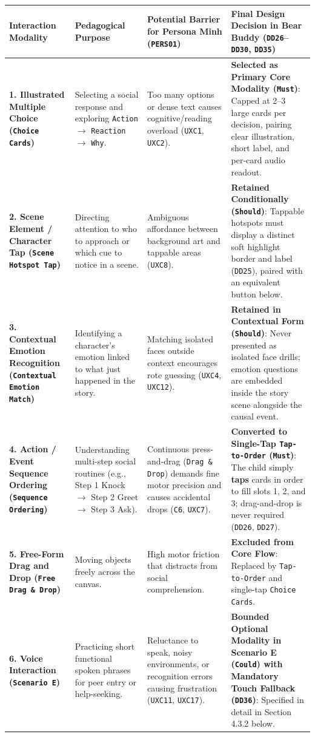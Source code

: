 \noindent\begin{xltabular}{\textwidth}{|p{2.0cm}|p{3.2cm}|X|p{2.8cm}|}
\hline
\textbf{Interaction Modality} & \textbf{Pedagogical Purpose} & \textbf{Potential Barrier for Persona Minh (\texttt{PERS01})} & \textbf{Final Design Decision in Bear Buddy (\texttt{DD26}–\texttt{DD30}, \texttt{DD35})} \\ \hline
\endhead
\textbf{1. Illustrated Multiple Choice (\texttt{Choice Cards})} & Selecting a social response and exploring \texttt{Action} $\rightarrow$ \texttt{Reaction} $\rightarrow$ \texttt{Why}. & Too many options or dense text causes cognitive/reading overload (\texttt{UXC1}, \texttt{UXC2}). & \textbf{Selected as Primary Core Modality (\texttt{Must})}: Capped at 2–3 large cards per decision, pairing clear illustration, short label, and per-card audio readout. \\ \hline
\textbf{2. Scene Element / Character Tap (\texttt{Scene Hotspot Tap})} & Directing attention to who to approach or which cue to notice in a scene. & Ambiguous affordance between background art and tappable areas (\texttt{UXC8}). & \textbf{Retained Conditionally (\texttt{Should})}: Tappable hotspots must display a distinct soft highlight border and label (\texttt{DD25}), paired with an equivalent button below. \\ \hline
\textbf{3. Contextual Emotion Recognition (\texttt{Contextual Emotion Match})} & Identifying a character's emotion linked to what just happened in the story. & Matching isolated faces outside context encourages rote guessing (\texttt{UXC4}, \texttt{UXC12}). & \textbf{Retained in Contextual Form (\texttt{Should})}: Never presented as isolated face drills; emotion questions are embedded inside the story scene alongside the causal event. \\ \hline
\textbf{4. Action / Event Sequence Ordering (\texttt{Sequence Ordering})} & Understanding multi-step social routines (e.g., Step 1 Knock $\rightarrow$ Step 2 Greet $\rightarrow$ Step 3 Ask). & Continuous press-and-drag (\texttt{Drag \& Drop}) demands fine motor precision and causes accidental drops (\texttt{C6}, \texttt{UXC7}). & \textbf{Converted to Single-Tap \texttt{Tap-to-Order} (\texttt{Must})}: The child simply \textbf{taps} cards in order to fill slots 1, 2, and 3; drag-and-drop is never required (\texttt{DD26}, \texttt{DD27}). \\ \hline
\textbf{5. Free-Form Drag and Drop (\texttt{Free Drag \& Drop})} & Moving objects freely across the canvas. & High motor friction that distracts from social comprehension. & \textbf{Excluded from Core Flow}: Replaced by \texttt{Tap-to-Order} and single-tap \texttt{Choice Cards}. \\ \hline
\textbf{6. Voice Interaction (\texttt{Scenario E})} & Practicing short functional spoken phrases for peer entry or help-seeking. & Reluctance to speak, noisy environments, or recognition errors causing frustration (\texttt{UXC11}, \texttt{UXC17}). & \textbf{Bounded Optional Modality in Scenario E (\texttt{Could}) with Mandatory Touch Fallback (\texttt{DD36})}: Specified in detail in Section 4.3.2 below. \\ \hline
\end{xltabular}



